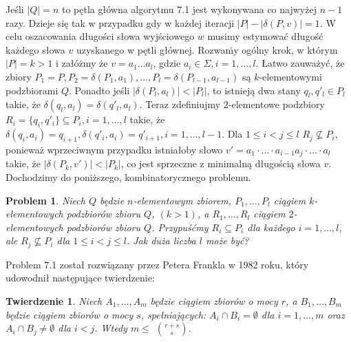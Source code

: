 \documentclass[12pt,a4paper]{article}
\newtheorem{twr}{Twierdzenie}[section]
\newtheorem{pro}{Problem}[section]
\begin{document}
 
Je\'sli $|Q|=n$ to p\k{e}tla g{\l}\'owna algorytmu 7.1 jest wykonywana co najwy\.zej $n-1$ razy. Dzieje si\k{e} tak w  przypadku gdy w każdej iteracji $|P|-|\delta(P,v)|=1$. W celu oszacowania d{\l}ugo\'sci s{\l}owa wyj\'sciowego $w$ musimy estymowa\'c d{\l}ugo\'s\'c ka\.zdego s{\l}owa $v$ uzyskanego w  p\k{e}tli g{\l}\'ownej. 
Rozwa\.my og\'olny krok, w kt\'orym $|P|=k>1$ i za{\l}\'o\.zmy \.ze $v=a_{1}\ldots a_{l}$, gdzie $a_{i}\in \Sigma, i=1,\ldots, l$. {\L}atwo zauwa\.zy\'c, \.ze zbiory $P_{1}=P, P_{2}=\delta(P_{1},a_{1}),\ldots, P_{l}=\delta(P_{l-1},a_{l-1})$ s\k{a} $k$-elementowymi podzbiorami $Q$. Ponadto je\'sli $|\delta(P_{l},a_{l})|<|P_{l}|$, to istniej\k{a} dwa stany $q_{l},q'_{l}\in P_{l}$ takie, \.ze $\delta(q_{l},a_{l})=\delta(q'_{l},a_{l})$. Teraz zdefiniujmy  $2$-elementowe podzbiory $R_{i}=\{q_{i},q'_{i}\}\subseteq P_{i}, i=1,\ldots,l$ takie, \.ze $\delta(q_{i},a_{i})=q_{i+1}, \delta(q'_{i},a_{i})=q'_{i+1}, i=1,\ldots,l-1$. Dla $1\leq i<j\leq l$ $R_{j}\not\subseteq P_{i}$, poniewa\.z wprzeciwnym przypadku istnia{\l}oby s{\l}owo $v'=a_{1}\cdot\ldots\cdot a_{i-1}a_{j}\cdot\ldots\cdot a_{l}$ takie, \.ze $|\delta(P_{k},v')|<|P_{k}|$, co jest sprzeczne z  minimaln\k{a} d{\l}ugo\'sci\k{a} s{\l}owa $v$. Dochodzimy do poni\.zszego, kombinatorycznego problemu.

\begin{pro}
Niech $Q$ b\k{e}dzie $n$-elementowym zbiorem, $P_{1},\ldots,P_{l}$ ci\k{a}giem $k$-elementowych podzbior\'ow zbioru $Q$, $(k>1)$, a $R_{1},\ldots,R_{l}$ ci\k{a}giem $2$-elementowych podzbiorów zbioru $Q$. Przypu\'s\'cmy $R_{i}\subseteq P_{i}$ dla ka\.zdego $i=1,\ldots,l$, ale $R_{j}\not\subseteq P_{i}$ dla $1\leq i<j\leq l$. Jak du\.za liczba $l$ mo\.ze by\'c?
\end{pro}

Problem 7.1 zosta{\l} rozwi\k{a}zany przez Petera Frankla w 1982 roku, kt\'ory udowodni{\l} nast\k{e}puj\k{a}ce twierdzenie: 

\begin{twr} 
Niech $A_{1},\ldots,A_{m}$ b\k{e}dzie ci\k{a}giem zbior\'ow o mocy $r$, a $B_{1},\ldots,B_{m}$ b\k{e}dzie ci\k{a}giem zbior\'ow o mocy $s$, spe{\l}niaj\k{a}cych: $A_{i}\cap B_{i}=\emptyset$ dla $i=1,\ldots,m$ oraz $A_{i}\cap B_{j}\neq\emptyset$ dla $i<j$. Wtedy $m\leq$ ${r+s}\choose{s}$.
\end{twr} 
\end{document}

